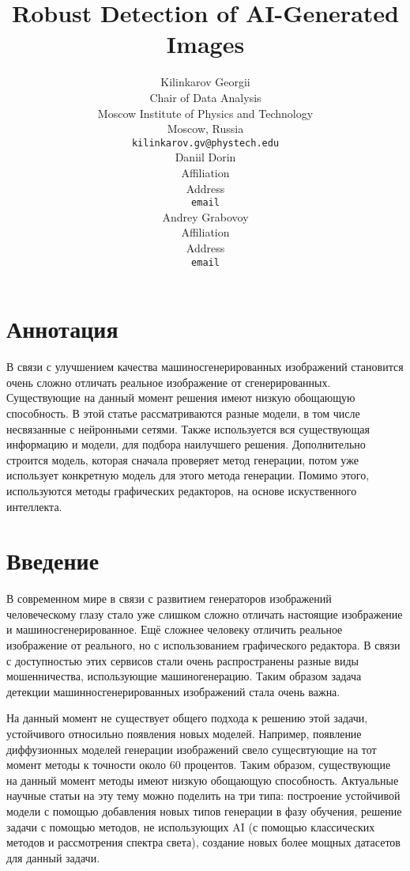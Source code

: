\documentclass{article}
\title{ Robust Detection of AI-Generated Images}
\author{%
    Kilinkarov Georgii \\
    Chair of Data Analysis\\
    Moscow Institute of Physics and Technology\\
    Moscow, Russia \\
    \texttt{kilinkarov.gv@phystech.edu} \\
    \And
    Daniil Dorin  \\
    Affiliation \\
    Address \\
    \texttt{email} \\
    \AND
    Andrey Grabovoy \\
    Affiliation \\
    Address \\
    \texttt{email}
}
\date{}
\begin{document}
\maketitle

\section{Аннотация}
В связи с улучшением качества машиносгенерированных изображений становится очень сложно отличать реальное изображение от сгенерированных.  Существующие на данный момент решения имеют низкую обощающую способность. В этой статье рассматриваются разные модели, в том числе несвязанные с нейронными сетями. Также используется вся существующая информацию и модели, для подбора наилучшего решения. Дополнительно строится модель, которая сначала проверяет метод генерации, потом уже использует конкретную модель для этого метода генерации. Помимо этого, используются методы графических редакторов, на основе искуственного интеллекта.



\section{Введение}
\label{sec:introduction}

В современном мире в связи с развитием генераторов изображений человеческому глазу стало уже слишком сложно отличать настоящие изображение и машиносгенерированное. Ещё сложнее человеку отличить реальное изображение от реального, но с использованием графического редактора.\cite{OnlineDetection} В связи с доступностью этих сервисов стали очень распространены разные виды мошенничества, использующие машиногенерацию. Таким образом задача детекции машинносгенерированных изображений стала очень важна.


На данный момент не существует общего подхода к решению этой задачи, устойчивого относильно появления новых моделей. Например, появление диффузионных моделей генерации изображений свело сущесвтующие на тот момент методы к точности около 60 процентов\cite{GenImage}. Таким образом, существующие на данный момент методы имеют низкую обощающую способность. Актуальные научные статьи на эту тему можно поделить на три типа: построение устойчивой модели с помощью добавления новых типов генерации в фазу обучения\cite{AivsAi, OnlineDetection}, решение задачи с помощью методов, не использующих AI (с помощью классических методов и рассмотрения спектра света)\cite{ZeroShot}, создание новых более мощных датасетов для данный задачи\cite{GenImage, CIFAKE}.
\end{document}
